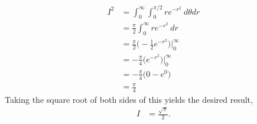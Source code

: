 \begin{align*}
  I^2 &= \int_{0}^{\infty} \int_{0}^{\pi/2} r e^{-r^2}  \ d\theta dr \\
  &= \frac{\pi}{2} \int_{0}^{\infty}  r e^{-r^2}  \ dr \\
  &= \frac{\pi}{2} \Big(-\frac{1}{2}e^{-r^2}\Big)\Big|_{0}^{\infty}  \\
  &= -\frac{\pi}{4} \Big( e^{-r^2}\Big)\Big|_{0}^{\infty}    \\
  &= -\frac{\pi}{4} \Big( 0 - e^0 \Big) \\
  &= \frac{\pi}{4} 
\end{align*}
Taking the square root of both sides of this yields the desired result,
\begin{align*}
  I &= \frac{\sqrt{\pi}}{2} .
\end{align*}
\EEN
\EEN %
%
